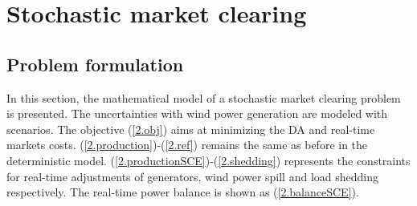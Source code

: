 \section{Stochastic market clearing} \label{sec:stochastic}
\subsection{Problem formulation}
In this section, the mathematical model of a stochastic market clearing problem is presented. The uncertainties with wind power generation are modeled with scenarios. The objective (\ref{2.obj}) aims at minimizing the DA and real-time markets costs. (\ref{2.production})-(\ref{2.ref}) remains the same as before in the deterministic model. (\ref{2.productionSCE})-(\ref{2.shedding}) represents the constraints for real-time adjustments of generators, wind power spill and load shedding respectively. The real-time power balance is shown as (\ref{2.balanceSCE}). 
